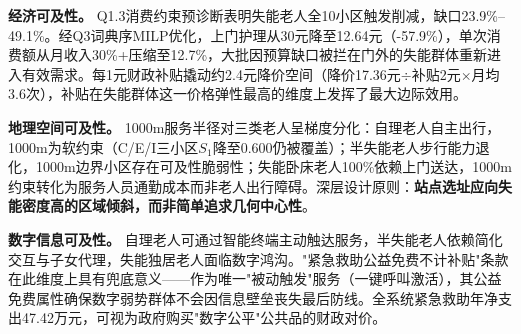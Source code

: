 \textbf{经济可及性。} Q1.3消费约束预诊断表明失能老人全10小区触发削减，缺口23.9\%--49.1\%。经Q3词典序MILP优化，上门护理从30元降至12.64元（-57.9\%），单次消费额从月收入30\%+压缩至12.7\%，大批因预算缺口被拦在门外的失能群体重新进入有效需求。每1元财政补贴撬动约2.4元降价空间（降价17.36元$\div$补贴2元$\times$月均3.6次），补贴在失能群体这一价格弹性最高的维度上发挥了最大边际效用。

\textbf{地理空间可及性。} 1000m服务半径对三类老人呈梯度分化：自理老人自主出行，1000m为软约束（C/E/I三小区$S_1$降至0.600仍被覆盖）；半失能老人步行能力退化，1000m边界小区存在可及性脆弱性；失能卧床老人100\%依赖上门送达，1000m约束转化为服务人员通勤成本而非老人出行障碍。深层设计原则：\textbf{站点选址应向失能密度高的区域倾斜，而非简单追求几何中心性}。

\textbf{数字信息可及性。} 自理老人可通过智能终端主动触达服务，半失能老人依赖简化交互与子女代理，失能独居老人面临数字鸿沟。"紧急救助公益免费不计补贴"条款在此维度上具有兜底意义——作为唯一"被动触发"服务（一键呼叫激活），其公益免费属性确保数字弱势群体不会因信息壁垒丧失最后防线。全系统紧急救助年净支出47.42万元，可视为政府购买"数字公平"公共品的财政对价。
